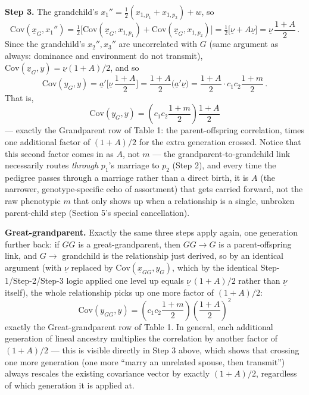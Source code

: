 \documentclass[12pt]{article}
\begin{document}
\textbf{Step 3.} The grandchild's $x_1''=\tfrac12(x_{1,p_1}+x_{1,p_2})+w$, so
\begin{equation}
\mathrm{Cov}(\underline x_G,x_1'') = \tfrac12\big[\mathrm{Cov}(\underline x_G,x_{1,p_1})+\mathrm{Cov}(\underline x_G,x_{1,p_2})\big] = \tfrac12\big[\underline\nu+A\underline\nu\big] = \underline\nu\,\frac{1+A}{2} \, .
\end{equation}
Since the grandchild's $x_2'',x_3''$ are uncorrelated with $G$ (same argument as always: dominance and environment do not transmit), $\mathrm{Cov}(\underline x_G,y)=\underline\nu(1+A)/2$, and so
\begin{equation}
\mathrm{Cov}(y_G,y) = \underline a'\Big[\underline\nu\,\frac{1+A}{2}\Big] = \frac{1+A}{2}\big(\underline a'\underline\nu\big) = \frac{1+A}{2}\cdot c_1c_2\frac{1+m}{2} \, .
\end{equation}
That is,
\begin{equation}
\boxed{\mathrm{Cov}(y_G,y) = \left(c_1c_2\frac{1+m}{2}\right)\frac{1+A}{2}}
\end{equation}
— exactly the Grandparent row of Table 1: the parent-offspring correlation, times one additional factor of $(1+A)/2$ for the extra generation crossed. Notice that this second factor comes in as $A$, not $m$ — the grandparent-to-grandchild link necessarily routes \emph{through} $p_1$'s marriage to $p_2$ (Step 2), and every time the pedigree passes through a marriage rather than a direct birth, it is $A$ (the narrower, genotype-specific echo of assortment) that gets carried forward, not the raw phenotypic $m$ that only shows up when a relationship is a single, unbroken parent-child step (Section 5's special cancellation).

\textbf{Great-grandparent.} Exactly the same three steps apply again, one generation further back: if $GG$ is a great-grandparent, then $GG\to G$ is a parent-offspring link, and $G\to$ grandchild is the relationship just derived, so by an identical argument (with $\underline\nu$ replaced by $\mathrm{Cov}(\underline x_{GG},y_G)$, which by the identical Step-1/Step-2/Step-3 logic applied one level up equals $\underline\nu\,(1+A)/2$ rather than $\underline\nu$ itself), the whole relationship picks up one more factor of $(1+A)/2$:
\begin{equation}
\boxed{\mathrm{Cov}(y_{GG},y) = \left(c_1c_2\frac{1+m}{2}\right)\left(\frac{1+A}{2}\right)^2}
\end{equation}
exactly the Great-grandparent row of Table 1. In general, each additional generation of lineal ancestry multiplies the correlation by another factor of $(1+A)/2$ — this is visible directly in Step 3 above, which shows that crossing one more generation (one more ``marry an unrelated spouse, then transmit'') always rescales the existing covariance vector by exactly $(1+A)/2$, regardless of which generation it is applied at.
\end{document}
